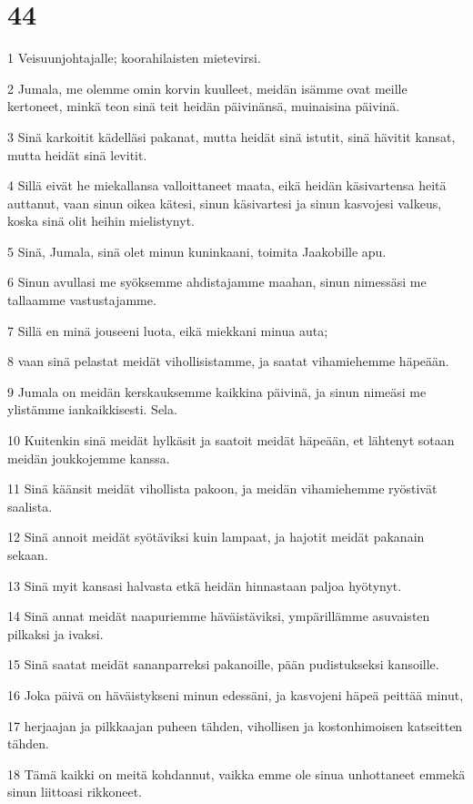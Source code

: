\chapter{44}

\par 1 Veisuunjohtajalle; koorahilaisten mietevirsi.
\par 2 Jumala, me olemme omin korvin kuulleet, meidän isämme ovat meille kertoneet, minkä teon sinä teit heidän päivinänsä, muinaisina päivinä.
\par 3 Sinä karkoitit kädelläsi pakanat, mutta heidät sinä istutit, sinä hävitit kansat, mutta heidät sinä levitit.
\par 4 Sillä eivät he miekallansa valloittaneet maata, eikä heidän käsivartensa heitä auttanut, vaan sinun oikea kätesi, sinun käsivartesi ja sinun kasvojesi valkeus, koska sinä olit heihin mielistynyt.
\par 5 Sinä, Jumala, sinä olet minun kuninkaani, toimita Jaakobille apu.
\par 6 Sinun avullasi me syöksemme ahdistajamme maahan, sinun nimessäsi me tallaamme vastustajamme.
\par 7 Sillä en minä jouseeni luota, eikä miekkani minua auta;
\par 8 vaan sinä pelastat meidät vihollisistamme, ja saatat vihamiehemme häpeään.
\par 9 Jumala on meidän kerskauksemme kaikkina päivinä, ja sinun nimeäsi me ylistämme iankaikkisesti. Sela.
\par 10 Kuitenkin sinä meidät hylkäsit ja saatoit meidät häpeään, et lähtenyt sotaan meidän joukkojemme kanssa.
\par 11 Sinä käänsit meidät vihollista pakoon, ja meidän vihamiehemme ryöstivät saalista.
\par 12 Sinä annoit meidät syötäviksi kuin lampaat, ja hajotit meidät pakanain sekaan.
\par 13 Sinä myit kansasi halvasta etkä heidän hinnastaan paljoa hyötynyt.
\par 14 Sinä annat meidät naapuriemme häväistäviksi, ympärillämme asuvaisten pilkaksi ja ivaksi.
\par 15 Sinä saatat meidät sananparreksi pakanoille, pään pudistukseksi kansoille.
\par 16 Joka päivä on häväistykseni minun edessäni, ja kasvojeni häpeä peittää minut,
\par 17 herjaajan ja pilkkaajan puheen tähden, vihollisen ja kostonhimoisen katseitten tähden.
\par 18 Tämä kaikki on meitä kohdannut, vaikka emme ole sinua unhottaneet emmekä sinun liittoasi rikkoneet.
